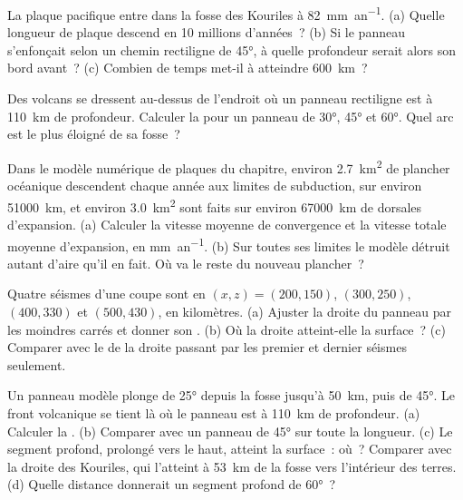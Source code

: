 \begin{exercise}[$\star$]\label{exo:b1:active-margins:2}
La plaque pacifique entre dans la fosse des Kouriles à \qty{82}{mm.an^{-1}}. (a) Quelle
longueur de plaque descend en 10 millions d'années~? (b) Si le panneau s'enfonçait selon un
chemin rectiligne de  \ang{45}, à quelle profondeur serait alors son bord avant~? (c)
Combien de temps met-il à atteindre \qty{600}{km}~?
\end{exercise}

\begin{exercise}[$\star$]\label{exo:b1:active-margins:3}
Des volcans se dressent au-dessus de l'endroit où un panneau rectiligne est à \qty{110}{km} de profondeur.
Calculer la  pour un panneau de  \ang{30}, \ang{45} et
\ang{60}. Quel arc est le plus éloigné de sa fosse~?
\end{exercise}

\begin{exercise}[$\star$]\label{exo:b1:active-margins:4}
Dans le modèle numérique de plaques du chapitre, environ \qty{2.7}{km^2} de plancher
océanique descendent chaque année aux limites de subduction, sur environ
\qty{51000}{km}, et environ \qty{3.0}{km^2} sont faits sur environ
\qty{67000}{km} de dorsales d'expansion. (a) Calculer la vitesse moyenne de convergence et
la vitesse totale moyenne d'expansion, en \unit{mm.an^{-1}}. (b) Sur toutes ses
limites le modèle détruit autant d'aire qu'il en fait. Où va le reste du
nouveau plancher~?
\end{exercise}

\begin{exercise}[$\star\star$]\label{exo:b1:active-margins:5}
Quatre séismes d'une coupe sont en $(x, z) = (200, 150)$, $(300, 250)$,
$(400, 330)$ et $(500, 430)$, en kilomètres. (a) Ajuster la droite du panneau par les moindres
carrés et donner son . (b) Où la droite atteint-elle la surface~? (c)
Comparer avec le  de la droite passant par les premier et dernier séismes seulement.
\end{exercise}

\begin{exercise}[$\star\star$]\label{exo:b1:active-margins:6}
Un panneau modèle plonge de \ang{25} depuis la fosse jusqu'à \qty{50}{km}, puis de
\ang{45}. Le front volcanique se tient là où le panneau est à \qty{110}{km} de profondeur. (a)
Calculer la . (b) Comparer avec un panneau de  \ang{45} sur toute
la longueur. (c) Le segment profond, prolongé vers le haut, atteint la surface~: où~? Comparer
avec la droite des Kouriles, qui l'atteint à \qty{53}{km} de la fosse vers l'intérieur des terres. (d)
Quelle distance donnerait un segment profond de \ang{60}~?
\end{exercise}

